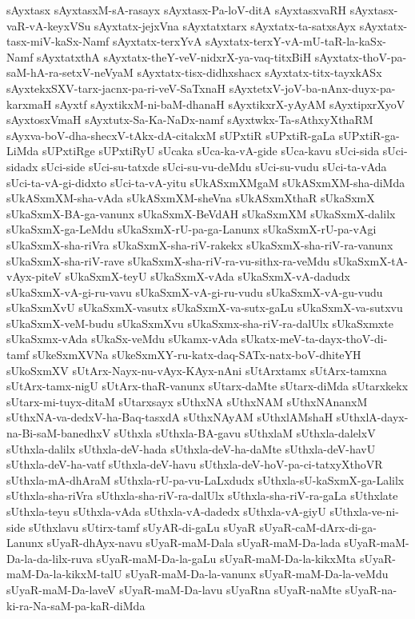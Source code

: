 {sAyxtasx
sAyxtasxM-sA-rasayx
sAyxtasx-Pa-loV-ditA
sAyxtasxvaRH
sAyxtasx-vaR-vA-keyxVSu
sAyxtatx-jejxVna
sAyxtatxtarx
sAyxtatx-ta-satxsAyx
sAyxtatx-tasx-miV-kaSx-Namf
sAyxtatx-terxYvA
sAyxtatx-terxY-vA-mU-taR-la-kaSx-Namf
sAyxtatxthA
sAyxtatx-theY-veV-nidxrX-ya-vaq-titxBiH
sAyxtatx-thoV-pa-saM-hA-ra-setxV-neVyaM
sAyxtatx-tisx-didhxshacx
sAyxtatx-titx-tayxkASx
sAyxtekxSXV-tarx-jacnx-pa-ri-veV-SaTxnaH
sAyxtetxV-joV-ba-nAnx-duyx-pa-karxmaH
sAyxtf
sAyxtikxM-ni-baM-dhanaH
sAyxtikxrX-yAyAM
sAyxtipxrXyoV
sAyxtosxVmaH
sAyxtutx-Sa-Ka-NaDx-namf
sAyxtwkx-Ta-sAthxyXthaRM
sAyxva-boV-dha-shecxV-tAkx-dA-citakxM
sUPxtiR
sUPxtiR-gaLa
sUPxtiR-ga-LiMda
sUPxtiRge
sUPxtiRyU
sUcaka
sUca-ka-vA-gide
sUca-kavu
sUci-sida
sUci-sidadx
sUci-side
sUci-su-tatxde
sUci-su-vu-deMdu
sUci-su-vudu
sUci-ta-vAda
sUci-ta-vA-gi-didxto
sUci-ta-vA-yitu
sUkASxmXMgaM
sUkASxmXM-sha-diMda
sUkASxmXM-sha-vAda
sUkASxmXM-sheVna
sUkASxmXthaR
sUkaSxmX
sUkaSxmX-BA-ga-vanunx
sUkaSxmX-BeVdAH
sUkaSxmXM
sUkaSxmX-dalilx
sUkaSxmX-ga-LeMdu
sUkaSxmX-rU-pa-ga-Lanunx
sUkaSxmX-rU-pa-vAgi
sUkaSxmX-sha-riVra
sUkaSxmX-sha-riV-rakekx
sUkaSxmX-sha-riV-ra-vanunx
sUkaSxmX-sha-riV-rave
sUkaSxmX-sha-riV-ra-vu-sithx-ra-veMdu
sUkaSxmX-tA-vAyx-piteV
sUkaSxmX-teyU
sUkaSxmX-vAda
sUkaSxmX-vA-dadudx
sUkaSxmX-vA-gi-ru-vavu
sUkaSxmX-vA-gi-ru-vudu
sUkaSxmX-vA-gu-vudu
sUkaSxmXvU
sUkaSxmX-vasutx
sUkaSxmX-va-sutx-gaLu
sUkaSxmX-va-sutxvu
sUkaSxmX-veM-budu
sUkaSxmXvu
sUkaSxmx-sha-riV-ra-dalUlx
sUkaSxmxte
sUkaSxmx-vAda
sUkaSx-veMdu
sUkamx-vAda
sUkatx-meV-ta-dayx-thoV-di-tamf
sUkeSxmXVNa
sUkeSxmXY-ru-katx-daq-SATx-natx-boV-dhiteYH
sUkoSxmXV
sUtArx-Nayx-nu-vAyx-KAyx-nAni
sUtArxtamx
sUtArx-tamxna
sUtArx-tamx-nigU
sUtArx-thaR-vanunx
sUtarx-daMte
sUtarx-diMda
sUtarxkekx
sUtarx-mi-tuyx-ditaM
sUtarxsayx
sUthxNA
sUthxNAM
sUthxNAnanxM
sUthxNA-va-dedxV-ha-Baq-tasxdA
sUthxNAyAM
sUthxlAMshaH
sUthxlA-dayx-na-Bi-saM-banedhxV
sUthxla
sUthxla-BA-gavu
sUthxlaM
sUthxla-dalelxV
sUthxla-dalilx
sUthxla-deV-hada
sUthxla-deV-ha-daMte
sUthxla-deV-havU
sUthxla-deV-ha-vatf
sUthxla-deV-havu
sUthxla-deV-hoV-pa-ci-tatxyXthoVR
sUthxla-mA-dhAraM
sUthxla-rU-pa-vu-LaLxdudx
sUthxla-sU-kaSxmX-ga-Lalilx
sUthxla-sha-riVra
sUthxla-sha-riV-ra-dalUlx
sUthxla-sha-riV-ra-gaLa
sUthxlate
sUthxla-teyu
sUthxla-vAda
sUthxla-vA-dadedx
sUthxla-vA-giyU
sUthxla-ve-ni-side
sUthxlavu
sUtirx-tamf
sUyAR-di-gaLu
sUyaR
sUyaR-caM-dArx-di-ga-Lanunx
sUyaR-dhAyx-navu
sUyaR-maM-Dala
sUyaR-maM-Da-lada
sUyaR-maM-Da-la-da-lilx-ruva
sUyaR-maM-Da-la-gaLu
sUyaR-maM-Da-la-kikxMta
sUyaR-maM-Da-la-kikxM-talU
sUyaR-maM-Da-la-vanunx
sUyaR-maM-Da-la-veMdu
sUyaR-maM-Da-laveV
sUyaR-maM-Da-lavu
sUyaRna
sUyaR-naMte
sUyaR-na-ki-ra-Na-saM-pa-kaR-diMda
}
